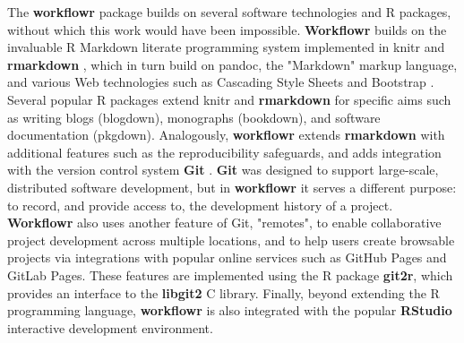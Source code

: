 \documentclass[9pt,a4paper]{extarticle}
\begin{document}
The \textbf{workflowr} package builds on several software technologies and R
packages, without which this work would have been impossible. \textbf{Workflowr}
builds on the invaluable R Markdown literate programming system
implemented in knitr \cite{Xie2014, knitr} and \textbf{rmarkdown} \cite{Xie2018,
rmarkdown}, which in turn build on pandoc, the "Markdown" markup
language, and various Web technologies such as Cascading Style Sheets
and Bootstrap \cite{Spurlock2013}. Several popular R packages extend
knitr and \textbf{rmarkdown} for specific aims such as writing blogs (blogdown),
monographs (bookdown), and software documentation (pkgdown).
Analogously, \textbf{workflowr} extends \textbf{rmarkdown} with additional features such
as the reproducibility safeguards, and adds integration with the version
control system \textbf{Git} \cite{Loeliger2012, Chacon2014}. \textbf{Git} was designed to
support large-scale, distributed software development, but in \textbf{workflowr}
it serves a different purpose: to record, and provide access to, the
development history of a project. \textbf{Workflowr} also uses another feature of
Git, "remotes", to enable collaborative project development across
multiple locations, and to help users create browsable projects via
integrations with popular online services such as GitHub Pages and
GitLab Pages. These features are implemented using the R package \textbf{git2r},
which provides an interface to the \textbf{libgit2} C library. Finally, beyond
extending the R programming language, \textbf{workflowr} is also integrated with
the popular \textbf{RStudio} interactive development environment.
\end{document}
